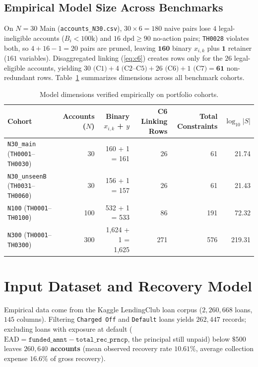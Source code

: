 \documentclass[10pt,a4paper]{article}
\begin{document}
\subsection{Empirical Model Size Across Benchmarks}
On $N=30$ Main (\texttt{accounts\_N30.csv}), $30 \times 6 = 180$ naive pairs lose $4$ legal-ineligible accounts ($B_i < 100\text{k}$) and $16$ $\text{dpd} \ge 90$ no-action pairs; \texttt{TH0028} violates both, so $4+16-1=20$ pairs are pruned, leaving $\mathbf{160}$ binary $x_{i,k}$ plus $\mathbf{1}$ retainer ($161$ variables). Disaggregated linking (\ref{eq:c6}) creates rows only for the $26$ legal-eligible accounts, yielding $30 \text{ (C1)} + 4 \text{ (C2--C5)} + 26 \text{ (C6)} + 1 \text{ (C7)} = \mathbf{61}$ non-redundant rows. Table~\ref{tab:dims} summarizes dimensions across all benchmark cohorts.

\begin{table}[!ht]
\centering
\caption{Model dimensions verified empirically on portfolio cohorts.}
\label{tab:dims}
\small
\begin{tabularx}{\textwidth}{Xrrrrr}
\toprule
\textbf{Cohort} & \textbf{Accounts ($N$)} & \textbf{Binary $x_{i,k}$ + $y$} & \textbf{C6 Linking Rows} & \textbf{Total Constraints} & \textbf{$\log_{10} |S|$} \\
\midrule
\texttt{N30\_main} (\texttt{TH0001}--\texttt{TH0030}) & 30 & 160 + 1 = 161 & 26 & 61 & 21.74 \\
\texttt{N30\_unseenB} (\texttt{TH0031}--\texttt{TH0060}) & 30 & 156 + 1 = 157 & 26 & 61 & 21.43 \\
\texttt{N100} (\texttt{TH0001}--\texttt{TH0100}) & 100 & 532 + 1 = 533 & 86 & 191 & 72.32 \\
\texttt{N300} (\texttt{TH0001}--\texttt{TH0300}) & 300 & 1,624 + 1 = 1,625 & 271 & 576 & 219.31 \\
\bottomrule
\end{tabularx}
\end{table}

\section{Input Dataset and Recovery Model}
Empirical data come from the Kaggle LendingClub loan corpus ($2,260,668$ loans, $145$ columns). Filtering \texttt{Charged Off} and \texttt{Default} loans yields $262,447$ records; excluding loans with exposure at default ($\text{EAD} = \texttt{funded\_amnt} - \texttt{total\_rec\_prncp}$, the principal still unpaid) below $\$500$ leaves \textbf{$260,640$ accounts} (mean observed recovery rate $10.61\%$, average collection expense $16.6\%$ of gross recovery).
\end{document}

